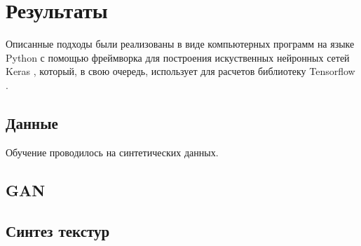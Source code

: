 \section{Результаты}
	Описанные подходы были реализованы в виде компьютерных программ на языке Python с помощью фреймворка для построения искуственных нейронных сетей Keras \cite{keras}, который, в свою очередь, использует для расчетов библиотеку Tensorflow \cite{tf}.
	\subsection{Данные}
		Обучение проводилось на синтетических данных. 
	\subsection{GAN}
	\subsection{Синтез текстур}